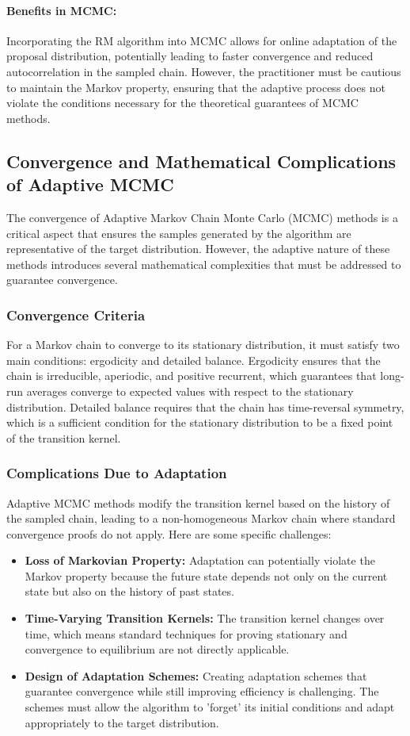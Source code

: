 \documentclass{article}
\begin{document}
\paragraph{Benefits in MCMC:}
Incorporating the RM algorithm into MCMC allows for online adaptation of the proposal distribution, potentially leading to faster convergence and reduced autocorrelation in the sampled chain. However, the practitioner must be cautious to maintain the Markov property, ensuring that the adaptive process does not violate the conditions necessary for the theoretical guarantees of MCMC methods.


\subsection*{Convergence and Mathematical Complications of Adaptive MCMC}
The convergence of Adaptive Markov Chain Monte Carlo (MCMC) methods is a critical aspect that ensures the samples generated by the algorithm are representative of the target distribution. However, the adaptive nature of these methods introduces several mathematical complexities that must be addressed to guarantee convergence.

\subsubsection{Convergence Criteria}
For a Markov chain to converge to its stationary distribution, it must satisfy two main conditions: ergodicity and detailed balance. Ergodicity ensures that the chain is irreducible, aperiodic, and positive recurrent, which guarantees that long-run averages converge to expected values with respect to the stationary distribution. Detailed balance requires that the chain has time-reversal symmetry, which is a sufficient condition for the stationary distribution to be a fixed point of the transition kernel.

\subsubsection{Complications Due to Adaptation}
Adaptive MCMC methods modify the transition kernel based on the history of the sampled chain, leading to a non-homogeneous Markov chain where standard convergence proofs do not apply. Here are some specific challenges:
\begin{itemize}
    \item \textbf{Loss of Markovian Property:} Adaptation can potentially violate the Markov property because the future state depends not only on the current state but also on the history of past states.
    \item \textbf{Time-Varying Transition Kernels:} The transition kernel changes over time, which means standard techniques for proving stationary and convergence to equilibrium are not directly applicable.
    \item \textbf{Design of Adaptation Schemes:} Creating adaptation schemes that guarantee convergence while still improving efficiency is challenging. The schemes must allow the algorithm to 'forget' its initial conditions and adapt appropriately to the target distribution.
\end{itemize}
\end{document}
